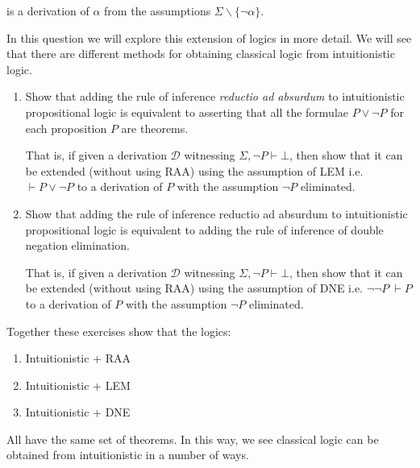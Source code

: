 \documentclass[11pt]{report}
\begin{document}
\begin{enumerate}
	is a derivation of $\alpha$ from the assumptions $\Sigma \backslash\{\lnot\alpha\}$.

	In this question we will explore this extension of logics in more detail. We will see that there are different methods for obtaining classical logic from intuitionistic logic.

		\begin{enumerate}
			\item Show that adding the rule of inference \emph{reductio ad absurdum} to intuitionistic propositional logic is equivalent to asserting that all the formulae $P \lor \lnot P$ for each proposition $P$ are theorems.
			

			That is, if given a derivation $\mathcal{D}$ witnessing $\Sigma,\lnot P \vdash \bot$, then show that it can be extended (without using RAA) using the assumption of LEM i.e. $\vdash P \lor \lnot P$ to a derivation of $P$ with the assumption $\lnot P$ eliminated.

			\item Show that adding the rule of inference reductio ad absurdum to intuitionistic propositional logic is equivalent to adding the rule of inference of double negation elimination. 
			

			That is, if given a derivation $\mathcal{D}$ witnessing $\Sigma,\lnot P \vdash \bot$, then show that it can be extended (without using RAA) using the assumption of DNE i.e. $\lnot \lnot P \ \vdash P$ to a derivation of $P$ with the assumption $\lnot P$ eliminated.
		\end{enumerate}

		Together these exercises show that the logics: 

			\begin{enumerate}
				\item Intuitionistic + RAA
				\item Intuitionistic + LEM 
				\item Intuitionistic + DNE 
			\end{enumerate}

		All have the same set of theorems. In this way, we see classical logic can be obtained from intuitionistic in a number of ways.

	\end{enumerate}	
\end{document}
